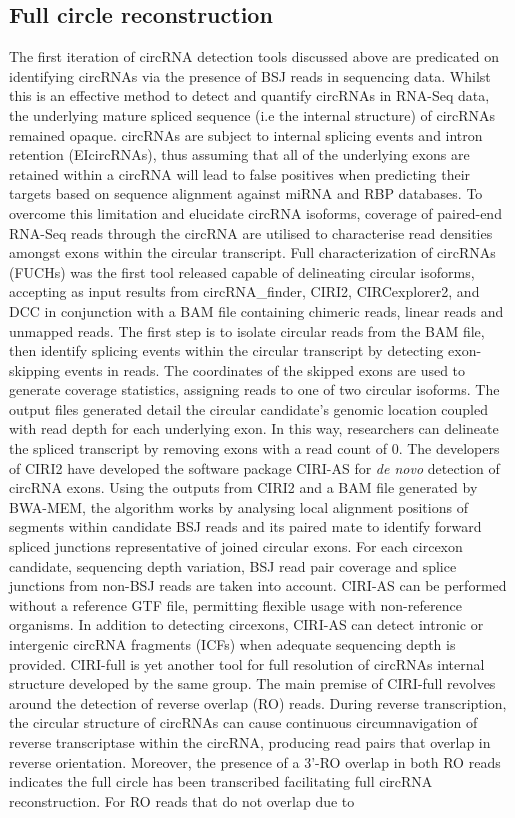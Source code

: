 \documentclass[journal,review,submit,pdftex,moreauthors]{Definitions/mdpi}
\begin{document}
\subsection{Full circle reconstruction} \label{Full circle reconstruction}
The first iteration of circRNA detection tools discussed above are predicated on identifying circRNAs via the presence of BSJ reads in sequencing data. Whilst this is an effective method to detect and quantify circRNAs in RNA-Seq data, the underlying mature spliced sequence (i.e the internal structure) of circRNAs remained opaque. circRNAs are subject to internal splicing events and intron retention (EIcircRNAs), thus assuming that all of the underlying exons are retained within a circRNA will lead to false positives when predicting their targets based on sequence alignment against miRNA and RBP databases. To overcome this limitation and elucidate circRNA isoforms, coverage of paired-end RNA-Seq reads through the circRNA are utilised to characterise read densities amongst exons within the circular transcript. Full characterization of circRNAs (FUCHs) \cite{FUCHS} was the first tool released capable of delineating circular isoforms, accepting as input results from  circRNA\_finder, CIRI2, CIRCexplorer2, and DCC in conjunction with a BAM file containing chimeric reads, linear reads and unmapped reads. The first step is to isolate circular reads from the BAM file, then identify splicing events within the circular transcript by detecting exon-skipping events in reads. The coordinates of the skipped exons are used to generate coverage statistics, assigning reads to one of two circular isoforms. The output files generated detail the circular candidate's genomic location coupled with read depth for each underlying exon. In this way, researchers can delineate the spliced transcript by removing exons with a read count of 0. The developers of CIRI2 have developed the software package CIRI-AS \cite{CIRI-AS} for \textit{de novo} detection of circRNA exons. Using the outputs from CIRI2 and a BAM file generated by BWA-MEM, the algorithm works by analysing local alignment positions of segments within candidate BSJ reads and its paired mate to identify forward spliced junctions representative of joined circular exons. For each circexon candidate, sequencing depth variation, BSJ read pair coverage and splice junctions from non-BSJ reads are taken into account. CIRI-AS can be performed without a reference GTF file, permitting flexible usage with non-reference organisms. In addition to detecting circexons, CIRI-AS can detect intronic or intergenic circRNA fragments (ICFs) when adequate sequencing depth is provided. CIRI-full \cite{CIRI-full} is yet another tool for full resolution of circRNAs internal structure developed by the same group. The main premise of CIRI-full revolves around the detection of reverse overlap (RO) reads. During reverse transcription, the circular structure of circRNAs can cause continuous circumnavigation of reverse transcriptase within the circRNA, producing read pairs that overlap in reverse orientation. Moreover, the presence of a 3'-RO overlap in both RO reads indicates the full circle has been transcribed facilitating full circRNA reconstruction. For RO reads that do not overlap due to 
\end{document}
